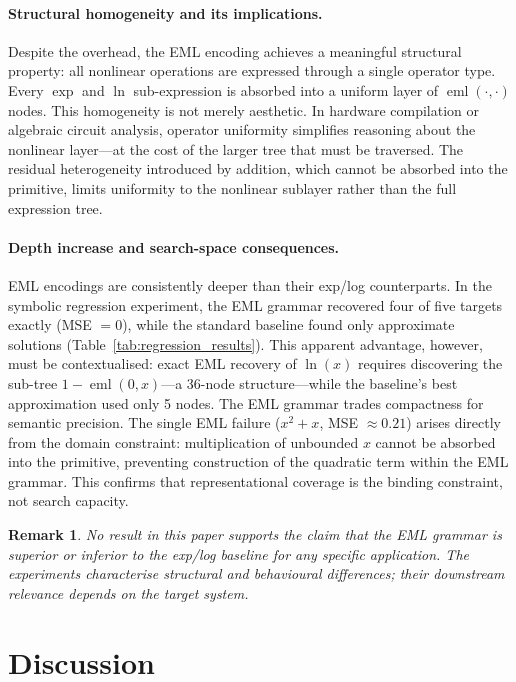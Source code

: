 \documentclass[11pt,a4paper]{article}
\newcommand{\eml}{\operatorname{eml}}
\newcommand{\expf}{\operatorname{exp}}
\newcommand{\lnf}{\operatorname{ln}}
\newtheorem{remark}{Remark}
\begin{document}
\paragraph{Structural homogeneity and its implications.}
Despite the overhead, the EML encoding achieves a meaningful structural
property: all nonlinear operations are expressed through a single
operator type. Every $\expf$ and $\lnf$ sub-expression is absorbed into
a uniform layer of $\eml(\cdot,\cdot)$ nodes. This homogeneity is not
merely aesthetic. In hardware compilation or algebraic circuit analysis,
operator uniformity simplifies reasoning about the nonlinear
layer---at the cost of the larger tree that must be traversed. The
residual heterogeneity introduced by addition, which cannot be absorbed
into the primitive, limits uniformity to the nonlinear sublayer rather
than the full expression tree.

\paragraph{Depth increase and search-space consequences.}
EML encodings are consistently deeper than their exp/log counterparts.
In the symbolic regression experiment, the EML grammar recovered four of
five targets exactly (MSE $= 0$), while the standard baseline found only
approximate solutions (Table~\ref{tab:regression_results}). This apparent
advantage, however, must be contextualised: exact EML recovery of
$\lnf(x)$ requires discovering the sub-tree $1 - \eml(0, x)$---a
36-node structure---while the baseline's best approximation used only
5 nodes. The EML grammar trades compactness for semantic precision.
The single EML failure ($x^2 + x$, MSE $\approx 0.21$) arises directly
from the domain constraint: multiplication of unbounded $x$ cannot be
absorbed into the primitive, preventing construction of the quadratic
term within the EML grammar. This confirms that representational
coverage is the binding constraint, not search capacity.

\begin{remark}
  No result in this paper supports the claim that the EML grammar is
  superior or inferior to the exp/log baseline for any specific
  application. The experiments characterise structural and behavioural
  differences; their downstream relevance depends on the target system.
\end{remark}

\section{Discussion}
\label{sec:discussion}
\end{document}
